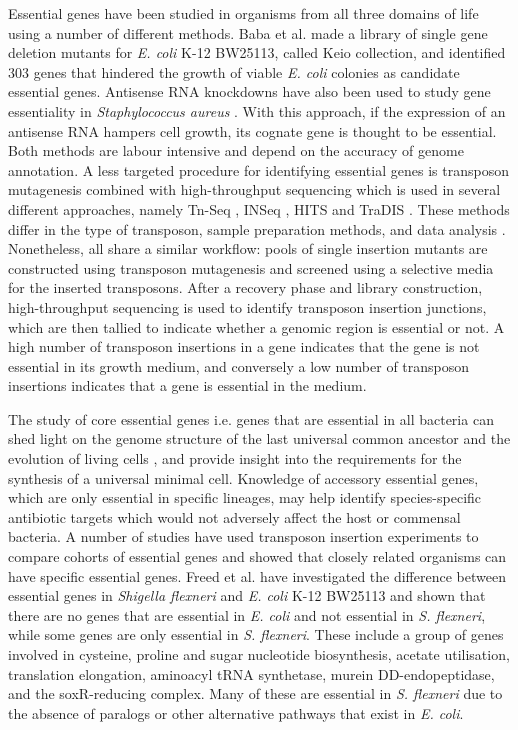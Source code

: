 \documentclass[12pt,letterpaper]{article}
\begin{document}
Essential genes have been studied in organisms from all three domains of life \cite{luo_deg_2014} using a number of different methods. Baba et al. \cite{baba_construction_2006} made a library of single gene deletion mutants for \textit{E. coli} K-12 BW25113, called Keio collection, and identified 303 genes that hindered the growth of viable \textit{E. coli} colonies as candidate essential genes.  Antisense RNA knockdowns have also been used to study gene essentiality in \textit{Staphylococcus aureus} \cite{forsyth_genome-wide_2002}. With this approach, if the expression of an antisense RNA hampers cell growth, its cognate gene is thought to be essential. Both methods are labour intensive and depend on the accuracy of genome annotation. A less targeted procedure for identifying essential genes is transposon mutagenesis combined with high-throughput sequencing \cite{barquist_approaches_2013, van_opijnen_transposon_2013, chao_design_2016} which is used in several different approaches, namely Tn-Seq \cite{van_opijnen_tn-seq:_2009}, INSeq \cite{goodman_identifying_2009}, HITS \cite{gawronski_tracking_2009} and TraDIS \cite{langridge_simultaneous_2009}. These methods differ in the type of transposon, sample preparation methods, and data analysis \cite{van_opijnen_transposon_2013}. Nonetheless, all share a similar workflow: pools of single insertion mutants are constructed using transposon mutagenesis and screened using a selective media for the inserted transposons. After a recovery phase and library construction, high-throughput sequencing is used to identify transposon insertion junctions, which are then tallied to indicate whether a genomic region is essential or not. A high number of transposon insertions in a gene indicates that the gene is not essential in its growth medium, and conversely a low number of transposon insertions indicates that a gene is essential in the medium.

The study of core essential genes i.e. genes that are essential in all bacteria can shed light on the genome structure of the last universal common ancestor and the evolution of living cells \cite{koonin_comparative_2003}, and provide insight into the requirements for the synthesis of a universal minimal cell. Knowledge of accessory essential genes, which are only essential in specific lineages, may help identify species-specific antibiotic targets which would not adversely affect the host or commensal bacteria. A number of studies have used transposon insertion experiments to compare cohorts of essential genes and showed that closely related organisms can have specific essential genes. Freed et al. \cite{freed_combining_2016} have investigated the difference between essential genes in \textit{Shigella flexneri} and \textit{E. coli} K-12 BW25113 and shown that there are no genes that are essential in \textit{E. coli} and not essential in \textit{S. flexneri}, while some genes are only essential in \textit{S. flexneri}. These include a group of genes involved in cysteine, proline and sugar nucleotide biosynthesis, acetate utilisation, translation elongation, aminoacyl tRNA synthetase, murein DD-endopeptidase, and the soxR-reducing complex. Many of these are essential in \textit{S. flexneri} due to the absence of paralogs or other alternative pathways that exist in \textit{E. coli}.
\end{document}
